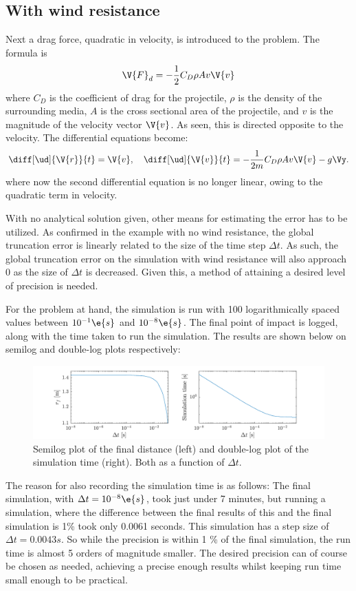 \documentclass[a4paper,10pt]{article} 	%
\numberwithin{equation}{section}
\begin{document}
	\subsection{With wind resistance}
	Next a drag force, quadratic in velocity, is introduced to the problem. The formula is
	\begin{equation}
		\V{F}_d = -\frac{1}{2}C_D \rho A v \V{v}
 	\end{equation} 
 	where $ C_D $ is the coefficient of drag for the projectile, $ \rho $ is the density of the surrounding media, $ A $ is the cross sectional area of the projectile, and $ v $ is the magnitude of the velocity vector $ \V{v} $. As seen, this is directed opposite to the velocity. The differential equations become:
 	\begin{equation}
 			\diff[\ud]{\V{r}}{t} = \V{v}, \quad \diff[\ud]{\V{v}}{t} = -\frac{1}{2m}C_D \rho A v \V{v} -g\Vy.
 	\end{equation}
 	where now the second differential equation is no longer linear, owing to the quadratic term in velocity.
 	
 	With no analytical solution given, other means for estimating the error has to be utilized. As confirmed in the example with no wind resistance, the global truncation error is linearly related to the size of the time step $ \Delta t $. As such, the global truncation error on the simulation with wind resistance will also approach 0 as the size of $ \Delta t $ is decreased. Given this, a method of attaining a desired level of precision is needed.
 	
 	For the problem at hand, the simulation is run with 100 logarithmically spaced values between $ 10^{-1} \e{s}$ and $ 10^{-8} \e{s} $. The final point of impact is logged, along with the time taken to run the simulation. The results are shown below on semilog and double-log plots respectively:
 	\begin{figure}[H]
 		\centering
 		\includegraphics[width = \linewidth]{simtime.pdf}
 		\caption{Semilog plot of the final distance (left) and double-log plot of the simulation time (right). Both as a function of $ \Delta t $.}
 		\label{fig:simtime}
 	\end{figure}
 	The reason for also recording the simulation time is as follows: The final simulation, with $ \Delta t = 10^{-8} \e{s} $, took just under 7 minutes, but running a simulation, where the difference between the final results of this and the final simulation is 1\% took only 0.0061 seconds. This simulation has a step size of $ \Delta t = 0.0043 s $. So while the precision is within 1 \% of the final simulation, the run time is almost 5 orders of magnitude smaller. The desired precision can of course be chosen as needed, achieving a precise enough results whilst keeping run time small enough to be practical.
 	
\end{document}
